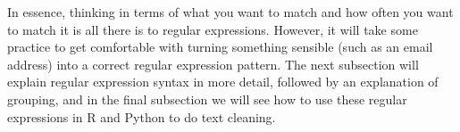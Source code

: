 In essence, thinking in terms of what you want to match and how often
you want to match it is all there is to regular expressions.
However, it will take some practice to get comfortable with turning something sensible (such as an email address) into a correct regular expression pattern.
The next subsection will explain regular expression syntax in more detail, followed by an explanation of grouping,
and in the final subsection we will see how to use these regular expressions in R and Python to do text cleaning.

\newcommand{\fnregexnote}{\footnote{Note that this is not a full review of everything that is possible with regular expressions, but this includes the most used options and should be enough for the majority of cases. Moreover, if you descend into the more specialized aspects of regular expressions (with beautiful names such as ``negative lookbehind assertions'') you will also run into differences between Python, R, and other languages, while the features used in this chapter should function in most implementations you come across unless specifically noted.}}



%


